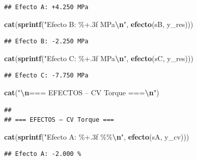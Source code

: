 \documentclass[
]{article}
\newenvironment{Shaded}{\begin{snugshade}}{\end{snugshade}}
\newcommand{\FunctionTok}[1]{\textcolor[rgb]{0.13,0.29,0.53}{\textbf{#1}}}
\newcommand{\NormalTok}[1]{#1}
\newcommand{\SpecialCharTok}[1]{\textcolor[rgb]{0.81,0.36,0.00}{\textbf{#1}}}
\newcommand{\StringTok}[1]{\textcolor[rgb]{0.31,0.60,0.02}{#1}}
\begin{document}
\begin{verbatim}
## Efecto A: +4.250 MPa
\end{verbatim}

\begin{Shaded}
\begin{Highlighting}[]
\FunctionTok{cat}\NormalTok{(}\FunctionTok{sprintf}\NormalTok{(}\StringTok{"Efecto B: \%+.3f MPa}\SpecialCharTok{\textbackslash{}n}\StringTok{"}\NormalTok{, }\FunctionTok{efecto}\NormalTok{(sB, y\_res)))}
\end{Highlighting}
\end{Shaded}

\begin{verbatim}
## Efecto B: -2.250 MPa
\end{verbatim}

\begin{Shaded}
\begin{Highlighting}[]
\FunctionTok{cat}\NormalTok{(}\FunctionTok{sprintf}\NormalTok{(}\StringTok{"Efecto C: \%+.3f MPa}\SpecialCharTok{\textbackslash{}n}\StringTok{"}\NormalTok{, }\FunctionTok{efecto}\NormalTok{(sC, y\_res)))}
\end{Highlighting}
\end{Shaded}

\begin{verbatim}
## Efecto C: -7.750 MPa
\end{verbatim}

\begin{Shaded}
\begin{Highlighting}[]
\FunctionTok{cat}\NormalTok{(}\StringTok{"}\SpecialCharTok{\textbackslash{}n}\StringTok{=== EFECTOS – CV Torque ===}\SpecialCharTok{\textbackslash{}n}\StringTok{"}\NormalTok{)}
\end{Highlighting}
\end{Shaded}

\begin{verbatim}
## 
## === EFECTOS – CV Torque ===
\end{verbatim}

\begin{Shaded}
\begin{Highlighting}[]
\FunctionTok{cat}\NormalTok{(}\FunctionTok{sprintf}\NormalTok{(}\StringTok{"Efecto A: \%+.3f \%\%}\SpecialCharTok{\textbackslash{}n}\StringTok{"}\NormalTok{, }\FunctionTok{efecto}\NormalTok{(sA, y\_cv)))}
\end{Highlighting}
\end{Shaded}

\begin{verbatim}
## Efecto A: -2.000 %
\end{verbatim}
\end{document}
